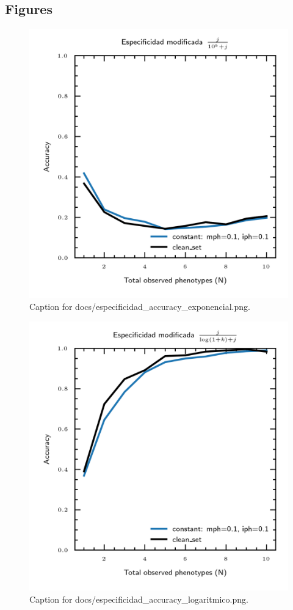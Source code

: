 \documentclass{article}
\begin{document}
\subsection{Figures}
\begin{figure}[h] \centering \includegraphics{docs/especificidad_accuracy_exponencial.png} \caption{Caption for docs/especificidad_accuracy_exponencial.png.} \end{figure}
\begin{figure}[h] \centering \includegraphics{docs/especificidad_accuracy_logaritmico.png} \caption{Caption for docs/especificidad_accuracy_logaritmico.png.} \end{figure}
\end{document}
